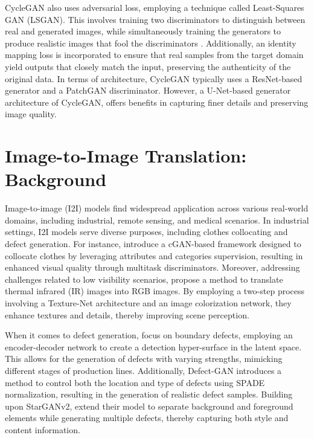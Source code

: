 \documentclass[UKenglish,12pt]{master-style}
\begin{document}
CycleGAN also uses adversarial loss, employing a technique called Least-Squares GAN (LSGAN). This involves training two discriminators to distinguish between real and generated images, while simultaneously training the generators to produce realistic images that fool the discriminators \cite{unpaired_horse2zebra_cyclgan} . Additionally, an identity mapping loss is incorporated to ensure that real samples from the target domain yield outputs that closely match the input, preserving the authenticity of the original data.
In terms of architecture, CycleGAN typically uses a ResNet-based generator and a PatchGAN discriminator. However, a U-Net-based generator architecture of CycleGAN, offers benefits in capturing finer details and preserving image quality. 

\section{Image-to-Image Translation: Background}

Image-to-image (I2I) models find widespread application across various real-world domains, including industrial, remote sensing, and medical scenarios.  In industrial settings, I2I models serve diverse purposes, including clothes collocating and defect generation. For instance, \cite{application}  introduce a cGAN-based framework designed to collocate clothes by leveraging attributes and categories supervision, resulting in enhanced visual quality through multitask discriminators. Moreover, addressing challenges related to low visibility scenarios, \cite{application}propose a method to translate thermal infrared (IR) images into RGB images. By employing a two-step process involving a Texture-Net architecture and an image colorization network, they enhance textures and details, thereby improving scene perception.

When it comes to defect generation, \cite{application} focus on boundary defects, employing an encoder-decoder network to create a detection hyper-surface in the latent space. This allows for the generation of defects with varying strengths, mimicking different stages of production lines. Additionally, Defect-GAN introduces a method to control both the location and type of defects using SPADE normalization, resulting in the generation of realistic defect samples. Building upon StarGANv2, extend their model to separate background and foreground elements while generating multiple defects, thereby capturing both style and content information.
\end{document}
